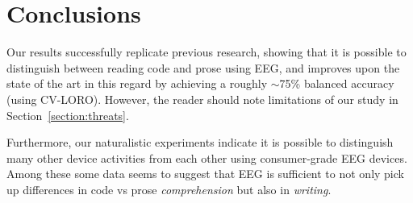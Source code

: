 \chapter{Conclusions}

Our results successfully replicate previous research, showing that it is possible to distinguish between reading code and prose using EEG, and improves upon the state of the art in this regard by achieving a roughly $\sim$75\% balanced accuracy (using CV-LORO). However, the reader should note limitations of our study in Section~\ref{section:threats}.

Furthermore, our naturalistic experiments indicate it is possible to distinguish many other device activities from each other using consumer-grade EEG devices. Among these some data seems to suggest that EEG is sufficient to not only pick up differences in code vs prose \emph{comprehension} but also in \emph{writing}.
